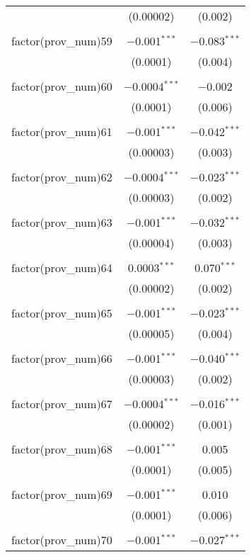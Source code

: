 \begin{table}[!htbp]
\begin{tabular}{@{\extracolsep{5pt}}lcc}
  & (0.00002) & (0.002) \\ 
  & & \\ 
 factor(prov\_num)59 & $-$0.001$^{***}$ & $-$0.083$^{***}$ \\ 
  & (0.0001) & (0.004) \\ 
  & & \\ 
 factor(prov\_num)60 & $-$0.0004$^{***}$ & $-$0.002 \\ 
  & (0.0001) & (0.006) \\ 
  & & \\ 
 factor(prov\_num)61 & $-$0.001$^{***}$ & $-$0.042$^{***}$ \\ 
  & (0.00003) & (0.003) \\ 
  & & \\ 
 factor(prov\_num)62 & $-$0.0004$^{***}$ & $-$0.023$^{***}$ \\ 
  & (0.00003) & (0.002) \\ 
  & & \\ 
 factor(prov\_num)63 & $-$0.001$^{***}$ & $-$0.032$^{***}$ \\ 
  & (0.00004) & (0.003) \\ 
  & & \\ 
 factor(prov\_num)64 & 0.0003$^{***}$ & 0.070$^{***}$ \\ 
  & (0.00002) & (0.002) \\ 
  & & \\ 
 factor(prov\_num)65 & $-$0.001$^{***}$ & $-$0.023$^{***}$ \\ 
  & (0.00005) & (0.004) \\ 
  & & \\ 
 factor(prov\_num)66 & $-$0.001$^{***}$ & $-$0.040$^{***}$ \\ 
  & (0.00003) & (0.002) \\ 
  & & \\ 
 factor(prov\_num)67 & $-$0.0004$^{***}$ & $-$0.016$^{***}$ \\ 
  & (0.00002) & (0.001) \\ 
  & & \\ 
 factor(prov\_num)68 & $-$0.001$^{***}$ & 0.005 \\ 
  & (0.0001) & (0.005) \\ 
  & & \\ 
 factor(prov\_num)69 & $-$0.001$^{***}$ & 0.010 \\ 
  & (0.0001) & (0.006) \\ 
  & & \\ 
 factor(prov\_num)70 & $-$0.001$^{***}$ & $-$0.027$^{***}$ \\ 

\end{tabular}
\end{table}

